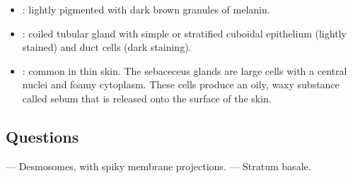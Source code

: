 \begin{multicols}{2}
\begin{itemize}
  \item {}: lightly pigmented with dark brown granules of melanin.
  
  \begin{center}
  \end{center}
  
  \item {}: coiled tubular gland with simple or stratified cuboidal epithelium (lightly stained) and duct cells (dark staining).
  
  \begin{center}
  \end{center}
  
  \item {}: common in thin skin. The sebaceceus glands are large cells with a central nuclei and foamy cytoplasm. These cells produce an oily, waxy substance called sebum that is released onto the surface of the skin.
  
  \begin{center}
  \end{center}
    
\end{itemize}
\end{multicols}


\subsection{Questions}
\begin{itemize}
   --- Desmosomes, with spiky membrane projections.
   --- Stratum basale.
\end{itemize}

\newpage
